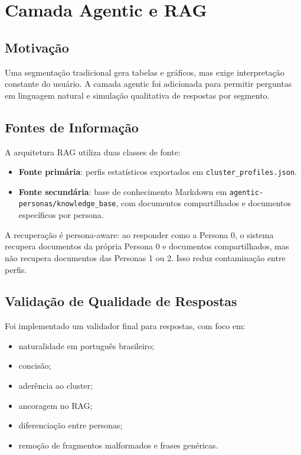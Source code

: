 \documentclass[12pt,a4paper]{article}
\begin{document}
\section{Camada Agentic e RAG}

\subsection{Motivação}

Uma segmentação tradicional gera tabelas e gráficos, mas exige interpretação constante do usuário. A camada agentic foi adicionada para permitir perguntas em linguagem natural e simulação qualitativa de respostas por segmento.

\subsection{Fontes de Informação}

A arquitetura RAG utiliza duas classes de fonte:

\begin{itemize}
  \item \textbf{Fonte primária}: perfis estatísticos exportados em \texttt{cluster\_profiles.json}.
  \item \textbf{Fonte secundária}: base de conhecimento Markdown em \texttt{agentic-personas/knowledge\_base}, com documentos compartilhados e documentos específicos por persona.
\end{itemize}

A recuperação é persona-aware: ao responder como a Persona 0, o sistema recupera documentos da própria Persona 0 e documentos compartilhados, mas não recupera documentos das Personas 1 ou 2. Isso reduz contaminação entre perfis.

\subsection{Validação de Qualidade de Respostas}

Foi implementado um validador final para respostas, com foco em:

\begin{itemize}
  \item naturalidade em português brasileiro;
  \item concisão;
  \item aderência ao cluster;
  \item ancoragem no RAG;
  \item diferenciação entre personas;
  \item remoção de fragmentos malformados e frases genéricas.
\end{itemize}
\end{document}
